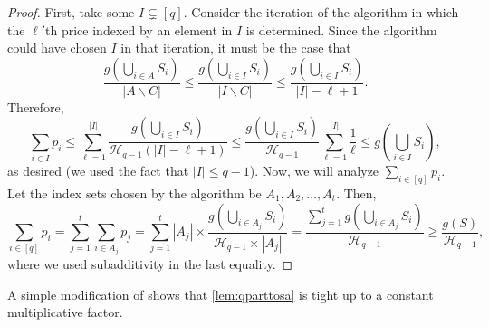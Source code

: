\documentclass[11pt]{article}\usepackage{amsfonts}
\numberwithin{theorem}{subsection}
\begin{document}
\begin{proof}
\noindent
First, take some $I\subsetneq [q].$ Consider the iteration of the algorithm in which the $\ell'$th price indexed by an element in $I$ is determined. Since the algorithm could have chosen $I$ in that iteration, it must be the case that  
$$
\frac{g(\bigcup_{i\in A}S_i)}{|A\backslash C|}\le 
\frac{g(\bigcup_{i\in I}S_i)}{|I\backslash C|} \le 
\frac{g(\bigcup_{i\in I}S_i)}{|I|-\ell+1}.
$$
Therefore, 
$$
\sum_{i\in I}p_i \le 
\sum_{\ell = 1}^{|I|}
\frac{g(\bigcup_{i\in I}S_i)}{\mathcal{H}_{q-1}(|I|-\ell+1)}\le 
\frac{g(\bigcup_{i\in I}S_i)}{\mathcal{H}_{q-1}}\sum_{\ell = 1}^{|I|}\frac{1}{\ell} \le
g(\bigcup_{i\in I}S_i),
$$
as desired (we used the fact that $|I|\le q-1$).
Now, we will analyze $\sum_{i\in [q]}p_i.$ Let the index sets chosen by the algorithm be $A_1, A_2, \ldots, A_t.$ Then,
$$
\sum_{i\in [q]}p_i = 
\sum_{j = 1}^t\sum_{i \in A_j}p_j = 
\sum_{j = 1}^t |A_j|\times 
\frac{g(\bigcup_{i\in A_j}S_i)}{\mathcal{H}_{q-1}\times |A_j|} = 
\frac{\sum_{j = 1}^tg(\bigcup_{i\in A_j}S_i)}{\mathcal{H}_{q-1}}\ge 
\frac{g(S)}{\mathcal{H}_{q-1}},
$$
where we used subadditivity in the last equality.
\end{proof}

\noindent
A simple modification of \cite[Appendix C]{BhawalkarR11} shows that \cref{lem:qparttosa} is tight up to a constant multiplicative factor.
\end{document}
